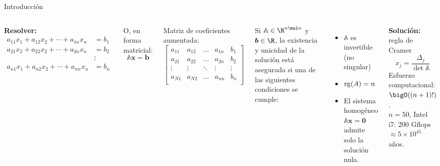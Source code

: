 \documentclass[9pt, aspectratio=169]{beamer}
\begin{document}
\begin{frame}{Introducción}
\begin{columns}[t]
\textbf{Resolver:}
\begin{align*}
    a_{11}x_1+a_{12}x_2+\cdots +a_{1n}x_n &= b_1 \\
    a_{21}x_2+a_{22}x_2+\cdots +a_{2n}x_n &= b_2 \\
                                   & \vdots \\
    a_{n1}x_1+a_{n2}x_2+\cdots +a_{nn}x_n &= b_n \\
 \end{align*} \pause
\vspace{-2em}

 O, en forma matricial:
 \begin{equation*}
  \mathbb{A} \mathbf{x} = \mathbf{b}
 \end{equation*}  \pause
\vspace{-1em}

  Matriz de coeficientes aumentada:
\begin{equation*}
 \left[ 
 \begin{array}{cccc|c}
 a_{11} & a_{12} & \ldots & a_{1n} & b_1 \\
 a_{21} & a_{22} & \ldots & a_{2n} & b_2\\
 \vdots & \vdots & \ddots & \vdots & \vdots\\
 a_{N1} & a_{N2} & \ldots & a_{nn} & b_n \\
 \end{array} \right] 
\end{equation*} \pause


Si $\mathbb{A} \in \R^{n \mul n}$ y $\bm{b} \in \R$, la existencia y unicidad de la solución está asegurada si una de las siguientes condiciones se cumple:
\begin{itemize}
    \item $\mathbb{A}$ es invertible (no singular)
    \item $\operatorname{rg}(A) = n$
    \item El sistema homogéneo $\mathbb{A} \bm{x} = \bm{0}$ admite solo la solución nula.
\end{itemize}

\hrulefill \pause \vspace{1em}


\textbf{Solución:} regla de Cramer
\[ x_j = \frac{\Delta_j}{\det{\mathbb{A}}} \]
Esfuerzo computacional: $\bigO((n+ 1)!)$. \\
$n = 50$, Intel i7: 200 Gflops $\approx 5 \times 10^{45}$ años.

\end{columns}
\end{frame}
\end{document}
